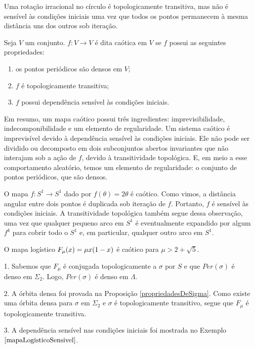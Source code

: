 \documentclass[../IC.tex]{subfiles}
\begin{document}
	\begin{exemplo}
		Uma rotação irracional no círculo é topologicamente transitiva, mas não é sensível às condições iniciais uma vez que todos os pontos permanecem à mesma distância uns dos outros sob iteração.
	\end{exemplo}
	
	\begin{definicao}
		Seja $V$ um conjunto. $f: V \rightarrow V$ é dita caótica em $V$ se $f$ possui as seguintes propriedades:
		\begin{enumerate}
			\item os pontos periódicos são densos em $V$;
			\item $f$ é topologicamente transitiva;
			\item $f$ possui dependência sensível às condições iniciais.
		\end{enumerate}
	\end{definicao}
	
	Em resumo, um mapa caótico possui três ingredientes: imprevisibilidade, indecomponibilidade e um elemento de regularidade. Um sistema caótico é imprevisível devido à dependência sensível às condições iniciais. Ele não pode ser dividido ou decomposto em dois subconjuntos abertos invariantes que não interajam sob a ação de $f$, devido à transitividade topológica. E, em meio a esse comportamento aleatório, temos um elemento de regularidade: o conjunto de pontos periódicos, que são densos.
	
	\begin{exemplo}
		O mapa $f: S^1 \to S^1$ dado por $f(\theta) = 2\theta$ é caótico. Como vimos, a distância angular entre dois pontos é duplicada sob iteração de $f$. Portanto, $f$ é sensível às condições iniciais. A transitividade topológica também segue dessa observação, uma vez que qualquer pequeno arco em $S^1$ é eventualmente expandido por algum $f^k$ para cobrir todo o $S^1$ e, em particular, qualquer outro arco em $S^1$.
	\end{exemplo}
	
	\begin{teorema}
		O mapa logístico $F_\mu(x)=\mu\/x(1-x)$ é caótico para $\mu > 2+\sqrt{5}$.
	\end{teorema}
	
	\begin{prova}
		
		1. Sabemos que $F_\mu$ é conjugada topologicamente a $\sigma$ por $S$ e que $Per(\sigma)$ é denso em $\Sigma_2$. Logo, $Per(\sigma)$ é denso em $\Lambda$.
		
		2. A órbita densa foi provada na Proposição \ref{propriedadesDeSigma}.
		Como existe uma órbita densa para $\sigma$ em $\Sigma_2$ e $\sigma$ é topologicamente transitivo, segue que $F_\mu$ é topologicamente transitiva.
		
		3. A dependência sensível nas condições iniciais foi mostrada no Exemplo $\ref{mapaLogisticoSensivel}$.
	\end{prova}
	
\end{document}
